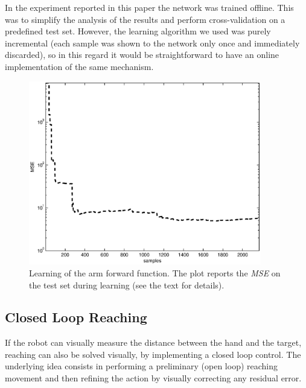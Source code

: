In the experiment reported in this paper the network was trained offline. 
This was to simplify the analysis of the results and perform cross-validation 
on a predefined test set. However, the learning algorithm we used was purely 
incremental (each sample was shown to the network only once and immediately 
discarded), so in this regard it would be straightforward to have an 
online implementation of the same mechanism.

\begin{figure}[!htbp]
\centerline{
\includegraphics[width=4.0in, angle=0 ]{./Figure/reachingError1.eps}
} \caption{Learning of the arm forward function. The plot reports the 
\emph{MSE} on the test set during learning (see the text for details).}
\label{fig:reaching-error}
\end{figure}

\subsection{Closed Loop Reaching} \label{Eq:ClosedLoop}
%
If the robot can visually measure the distance
between the hand and the target, reaching can also be solved
visually, by implementing a closed loop control. The underlying idea consists in
performing a preliminary (open loop) reaching movement and then refining the action
by visually correcting any residual error. 

